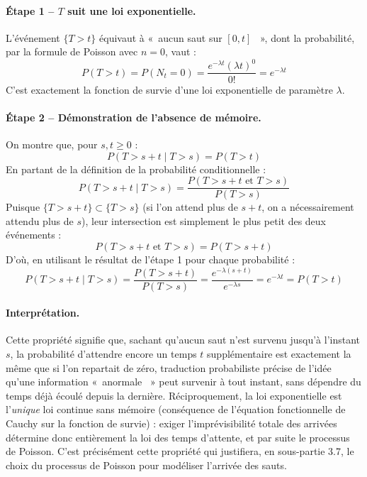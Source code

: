 \documentclass{article}
\providecommand{\og}{«~}
\providecommand{\fg}{~»}
\begin{document}
\paragraph{Étape 1 -- $T$ suit une loi exponentielle.} L'événement $\{T>t\}$ équivaut à \og aucun saut sur $[0,t]$ \fg, dont la probabilité, par la formule de Poisson avec $n=0$, vaut :
\begin{equation}
P(T>t) = P(N_t = 0) = \frac{e^{-\lambda t}(\lambda t)^0}{0!} = e^{-\lambda t}
\end{equation}
C'est exactement la fonction de survie d'une loi exponentielle de paramètre $\lambda$.
\paragraph{Étape 2 -- Démonstration de l'absence de mémoire.} On montre que, pour $s,t \geq 0$ :
\begin{equation}
P(T>s+t \mid T>s) = P(T>t)
\end{equation}
En partant de la définition de la probabilité conditionnelle :
\begin{equation}
P(T>s+t \mid T>s) = \frac{P(T>s+t \text{ et } T>s)}{P(T>s)}
\end{equation}
Puisque $\{T>s+t\} \subset \{T>s\}$ (si l'on attend plus de $s+t$, on a nécessairement attendu plus de $s$), leur intersection est simplement le plus petit des deux événements :
\begin{equation}
P(T>s+t \text{ et } T>s) = P(T>s+t)
\end{equation}
D'où, en utilisant le résultat de l'étape 1 pour chaque probabilité :
\begin{equation}
P(T>s+t \mid T>s) = \frac{P(T>s+t)}{P(T>s)} = \frac{e^{-\lambda(s+t)}}{e^{-\lambda s}} = e^{-\lambda t} = P(T>t)
\end{equation}
\paragraph{Interprétation.} Cette propriété signifie que, sachant qu'aucun saut n'est survenu jusqu'à l'instant $s$, la probabilité d'attendre encore un temps $t$ supplémentaire est exactement la même que si l'on repartait de zéro, traduction probabiliste précise de l'idée qu'une information \og anormale \fg{} peut survenir à tout instant, sans dépendre du temps déjà écoulé depuis la dernière. Réciproquement, la loi exponentielle est l'\emph{unique} loi continue sans mémoire (conséquence de l'équation fonctionnelle de Cauchy sur la fonction de survie) : exiger l'imprévisibilité totale des arrivées détermine donc entièrement la loi des temps d'attente, et par suite le processus de Poisson. C'est précisément cette propriété qui justifiera, en sous-partie 3.7, le choix du processus de Poisson pour modéliser l'arrivée des sauts.
\end{document}
